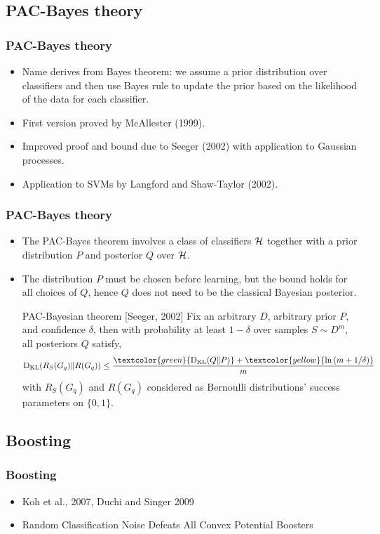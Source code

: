 \documentclass[mathserif]{beamer}
\begin{document}
\subsection{PAC-Bayes theory}
\begin{frame}
\frametitle{PAC-Bayes theory}
\begin{itemize}
\item Name derives from Bayes theorem: we assume a prior
distribution over  classifiers and then use
Bayes rule to update the prior based on the likelihood of
the data for each classifier.
\item First version proved by McAllester (1999).
\item Improved proof and bound due to Seeger (2002) with
 application to Gaussian processes.
\item Application to SVMs by Langford and Shaw-Taylor (2002).
 \end{itemize}
\end{frame}
%
\begin{frame}
\frametitle{PAC-Bayes theory}
\begin{itemize}
\item The PAC-Bayes theorem involves a class of classifiers ${\mathcal{H}}$
together with a prior distribution $P$ and posterior $Q$ over ${\mathcal{H}}$.
\item The distribution $P$ must be chosen before learning, but the
bound holds for all choices of $Q$, hence $Q$ does not need to
be the classical Bayesian posterior.
\begin{block}{PAC-Bayesian theorem [Seeger, 2002]} Fix an arbitrary $D$, arbitrary prior $P$, and confidence $\delta$, then with probability at least $1 -\delta$ over samples $S \sim D^m$, all
posteriors $Q$ satisfy,
\begin{align*}
\KL(R_S(G_q)\Vert R(G_q)) \leq  \frac{   \textcolor{green}{\KL(Q \Vert P)}+\textcolor{yellow}{\ln{\paren{m+1/\delta} } }   }{m}
\end{align*}
 with $ R_S(G_q)$ and $R(G_q)$ considered as Bernoulli distributions' success parameters on $\{0,1\}$.
\end{block}
 \end{itemize}
\end{frame}
%

\subsection{Boosting}
\begin{frame}
\frametitle{Boosting}
\begin{itemize}
\item Koh et al., 2007, Duchi and Singer
2009
\item Random Classification Noise
Defeats All Convex Potential Boosters
\end{itemize}
\end{frame}
\end{document}
